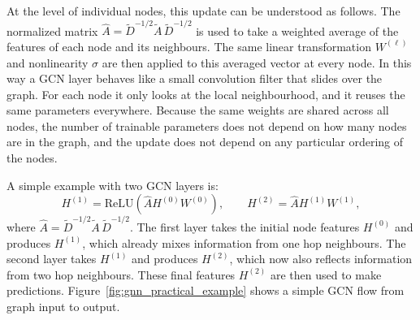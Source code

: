 \noindent At the level of individual nodes, this update can be understood as follows.
The normalized matrix $\hat{A}=\tilde{D}^{-1/2} \tilde{A}\, \tilde{D}^{-1/2}$ is used to take a weighted average of the features of each node and its neighbours.
The same linear transformation $W^{(\ell)}$ and nonlinearity $\sigma$ are then applied to this averaged vector at every node.
In this way a GCN layer behaves like a small convolution filter that slides over the graph. For each node it only looks at the local neighbourhood, and it reuses the same parameters everywhere.
Because the same weights are shared across all nodes, the number of trainable parameters does not depend on how many nodes are in the graph, and the update does not depend on any particular ordering of the nodes.

\noindent A simple example with two GCN layers is:
\begin{equation}
H^{(1)} = \mathrm{ReLU}(\hat{A}H^{(0)}W^{(0)}), \qquad
H^{(2)} = \hat{A}H^{(1)}W^{(1)},
\end{equation}
where $\hat{A}=\tilde{D}^{-1/2} \tilde{A}\, \tilde{D}^{-1/2}$.
The first layer takes the initial node features $H^{(0)}$ and produces $H^{(1)}$, which already mixes information from one hop neighbours.
The second layer takes $H^{(1)}$ and produces $H^{(2)}$, which now also reflects information from two hop neighbours.
These final features $H^{(2)}$ are then used to make predictions. Figure~\ref{fig:gnn_practical_example} shows a simple GCN flow from graph input to output.


